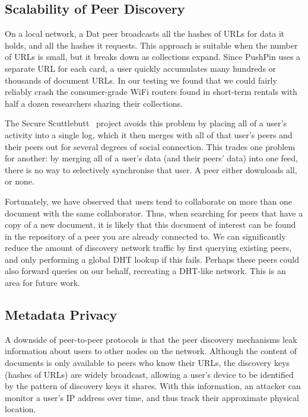 \documentclass[sigplan,10pt]{acmart}
\begin{document}
\subsection{Scalability of Peer Discovery}


On a local network, a Dat peer broadcasts all the hashes of URLs for data it holds, and all the hashes it requests.
This approach is suitable when the number of URLs is small, but it breaks down as collections expand.
Since PushPin uses a separate URL for each card, a user quickly accumulates many hundreds or thousands of document URLs.
In our testing we found that we could fairly reliably crash the consumer-grade WiFi routers found in short-term rentals with half a dozen researchers sharing their collections.


The Secure Scuttlebutt~\cite{Tarr:2019ba} project avoids this problem by placing all of a user's activity into a single log, which it then merges with all of that user's peers and their peers out for several degrees of social connection. This trades one problem for another: by merging all of a user's data (and their peers' data) into one feed, there is no way to selectively synchronise that user. A peer either downloads all, or none.

Fortunately, we have observed that users tend to collaborate on more than one document with the same collaborator.
Thus, when searching for peers that have a copy of a new document, it is likely that this document of interest can be found in the repository of a peer you are already connected to.
We can significantly reduce the amount of discovery network traffic by first querying existing peers, and only performing a global DHT lookup if this fails.
Perhaps these peers could also forward queries on our behalf, recreating a DHT-like network.
This is an area for future work.

\subsection{Metadata Privacy}

A downside of peer-to-peer protocols is that the peer discovery mechanisms leak information about users to other nodes on the network.
Although the content of documents is only available to peers who know their URLs, the discovery keys (hashes of URLs) are widely broadcast, allowing a user's device to be identified by the pattern of discovery keys it shares.
With this information, an attacker can monitor a user's IP address over time, and thus track their approximate physical location.
\end{document}
